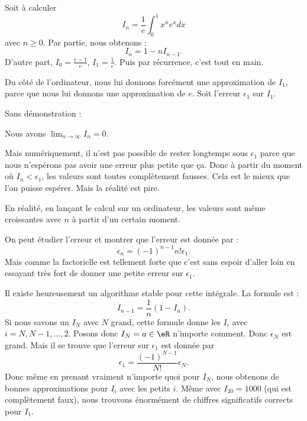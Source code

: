 \begin{example}
	Soit à calculer
	\begin{equation}
		I_n=\frac{1}{ e }\int_0^1x^ne^xdx
	\end{equation}
	avec \( n\geq 0\). Par partie, nous obtenons :
	\begin{equation}
		I_n=1-nI_{n-1}.
	\end{equation}
	D'autre part, \( I_0=\frac{ e-1 }{ e }\), \( I_1=\frac{1}{ e }\). Puis par récurrence, c'est tout en main.

	Du côté de l'ordinateur, nous lui donnons forcément une approximation de \( I_1\), parce que nous lui donnons une approximation de \( e\). Soit l'erreur \( \epsilon_1\) sur \( I_1\).

	Sans démonstration :
	\begin{lemma}
		Nous avons \( \lim_{n\to \infty} I_n=0\).
	\end{lemma}
	Mais numériquement, il n'est pas possible de rester longtemps sous \( \epsilon_1\) parce que nous n'espérons pas avoir une erreur plus petite que ça. Donc à partir du moment où \( I_n<\epsilon_1\), les valeurs sont toutes complètement fausses. Cela est le mieux que l'on puisse espérer. Mais la réalité est pire.

	En réalité, en lançant le calcul sur un ordinateur, les valeurs sont même croissantes avec \( n\) à partir d'un certain moment.

	On peut étudier l'erreur et montrer que l'erreur est donnée par :
	\begin{equation}
		\epsilon_n=(-1)^{n-1}n!\epsilon_1.
	\end{equation}
	Mais comme la factorielle est tellement forte que c'est sans espoir d'aller loin en essayant très fort de donner une petite erreur sur \( \epsilon_1\).

\end{example}

Il existe heureusement un algorithme stable pour cette intégrale. La formule est :
\begin{equation}
	I_{n-1}=\frac{1}{ n }(1-I_n).
\end{equation}
Si nous savons un \( I_N\) avec \( N\) grand, cette formule donne les \( I_i\) avec \( i=N,N-1,\ldots, 2\). Posons donc \( I_N=a\in \eR\) n'importe comment. Donc \( \epsilon_N\) est grand. Mais il se trouve que l'erreur sur \( \epsilon_1\) est donnée par
\begin{equation}
	\epsilon_1=\frac{ (-1)^{N-1} }{ N! }\epsilon_N.
\end{equation}
Donc même en prenant vraiment n'importe quoi pour \( I_N\), nous obtenons de bonnes approximations pour \( I_i\) avec les petits \( i\). Même avec \( I_{20}=1000\) (qui est complètement faux), nous trouvons énormément de chiffres significatifs corrects pour \( I_1\).


